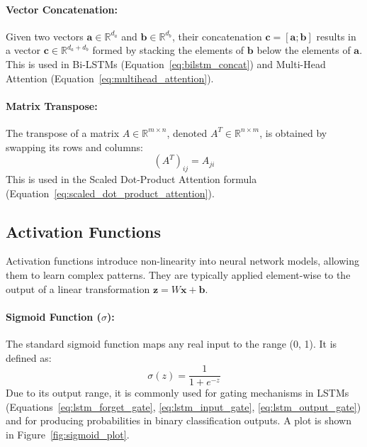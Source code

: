\begin{appendices}
  \paragraph{Vector Concatenation:}
  Given two vectors \( \bm{a} \in \mathbb{R}^{d_a} \) and \( \bm{b} \in \mathbb{R}^{d_b} \), their concatenation \( \bm{c} = [\bm{a} ; \bm{b}] \) results in a vector \( \bm{c} \in \mathbb{R}^{d_a + d_b} \) formed by stacking the elements of \( \bm{b} \) below the elements of \( \bm{a} \). This is used in Bi-LSTMs (Equation~\ref{eq:bilstm_concat}) and Multi-Head Attention (Equation~\ref{eq:multihead_attention}).

  \paragraph{Matrix Transpose:}
  The transpose of a matrix \( A \in \mathbb{R}^{m \times n} \), denoted \( A^T \in \mathbb{R}^{n \times m} \), is obtained by swapping its rows and columns:
  \begin{equation}
    (A^T)_{ij} = A_{ji}
  \end{equation}
  This is used in the Scaled Dot-Product Attention formula (Equation~\ref{eq:scaled_dot_product_attention}).


  \subsection{Activation Functions}
  Activation functions introduce non-linearity into neural network models, allowing them to learn complex patterns. They are typically applied element-wise to the output of a linear transformation \( \bm{z} = W\bm{x} + \bm{b} \).

  \paragraph{Sigmoid Function (\( \sigma \)):}
  The standard sigmoid function maps any real input to the range (0, 1). It is defined as:
  \begin{equation}
    \sigma(z) = \frac{1}{1 + e^{-z}}
  \end{equation}
  Due to its output range, it is commonly used for gating mechanisms in LSTMs (Equations~\ref{eq:lstm_forget_gate}, \ref{eq:lstm_input_gate}, \ref{eq:lstm_output_gate}) and for producing probabilities in binary classification outputs. A plot is shown in Figure~\ref{fig:sigmoid_plot}.


\end{appendices}
